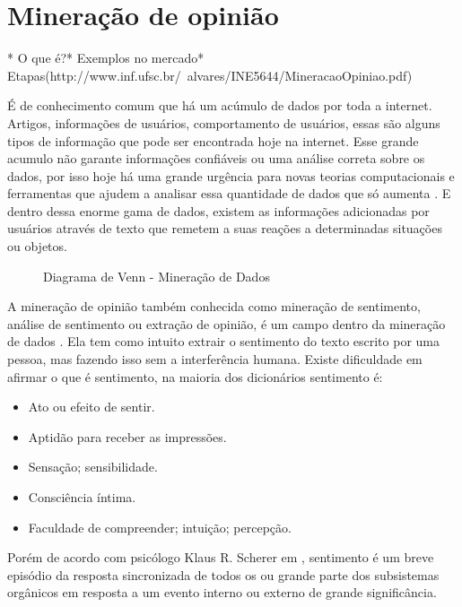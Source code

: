 \section{Mineração de opinião}\label{sec:mineracao_dados}

* O que é?* Exemplos no mercado* Etapas(http://www.inf.ufsc.br/~alvares/INE5644/MineracaoOpiniao.pdf)

É de conhecimento comum que há um acúmulo de dados por toda a internet. Artigos, informações de usuários, comportamento de usuários, essas são alguns tipos de informação que pode ser encontrada hoje na internet. Esse grande acumulo não garante informações confiáveis ou uma análise correta sobre os dados, por isso hoje há uma grande urgência para novas teorias computacionais e ferramentas que ajudem a analisar essa quantidade de dados que só aumenta \cite{fayyad1996data}. E dentro dessa enorme gama de dados, existem as informações adicionadas por usuários através de texto que remetem a suas reações a determinadas situações ou objetos.

\begin{figure}[ht]
	
	\centering{}
	\caption{Diagrama de Venn - Mineração de Dados}
	\label{uni}
\end{figure}

A mineração de opinião também conhecida como mineração de sentimento, análise de sentimento ou extração de opinião, é um campo dentro da mineração de dados \cite{santos2014mineraccao}. Ela tem como intuito extrair o sentimento do texto escrito por uma pessoa, mas fazendo isso sem a interferência humana. Existe  dificuldade em afirmar o que é sentimento, na maioria dos dicionários sentimento é:
\begin{itemize}
\item Ato ou efeito de sentir.
\item Aptidão para receber as impressões.
\item Sensação; sensibilidade.
\item Consciência íntima.
\item Faculdade de compreender; intuição; percepção.
\end{itemize}

Porém de acordo com psicólogo Klaus R. Scherer em \cite{scherer2001emotional}, sentimento é um breve episódio da resposta sincronizada de todos os ou grande parte dos subsistemas orgânicos em resposta a um evento interno ou externo de grande significância.

